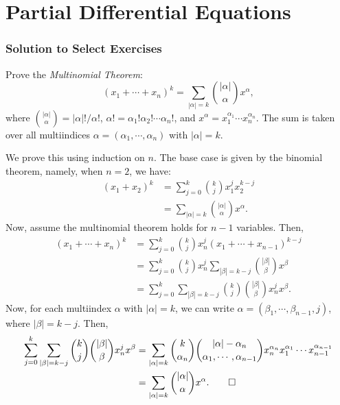 \section{Partial Differential Equations}

\subsubsection{Solution to Select Exercises}

\begin{problem}
  Prove the \emph{Multinomial Theorem}:
  \begin{equation}\label{eq:multinomial_formula}
    (x_1 + \cdots + x_n)^k = \sum_{|\alpha|=k} \binom{|\alpha|}{\alpha} x^\alpha
  ,\end{equation}
  where $\binom{|\alpha|}{\alpha} = |\alpha|!/\alpha!$, $\alpha! = \alpha_1!\alpha_2!\cdots\alpha_n!$, and $x^\alpha = x_1^{\alpha_1} \cdots x_n^{\alpha_n}$. The sum is taken over all multiindices $\alpha = (\alpha_1, \cdots, \alpha_n)$ with $|\alpha| = k$.
\end{problem}

\begin{solution}
  We prove this using induction on $n$. The base case is given by the binomial theorem, namely, when $n = 2$, we have:
  \begin{align*}
    (x_1 + x_2)^k &= \sum_{j=0}^k \binom{k}{j} x_1^j x_2^{k-j} \\
                    &= \sum_{|\alpha|=k} \binom{|\alpha|}{\alpha} x^\alpha
  .\end{align*}
  Now, assume the multinomial theorem holds for $n-1$ variables. Then,
  \begin{align*}
    (x_1 + \cdots + x_n)^k &= \sum_{j=0}^k \binom{k}{j} x_n^j (x_1 + \cdots + x_{n-1})^{k-j} \\
                            &= \sum_{j=0}^k \binom{k}{j} x_n^j \sum_{|\beta|=k-j} \binom{|\beta|}{\beta} x^\beta \\
                            &= \sum_{j=0}^k \sum_{|\beta|=k-j} \binom{k}{j} \binom{|\beta|}{\beta} x_n^j x^\beta
  .\end{align*}
  Now, for each multiindex $\alpha$ with $|\alpha| = k$, we can write $\alpha = (\beta_1, \cdots, \beta_{n-1}, j)$, where $|\beta| = k-j$. Then,
  \begin{align*}
    \sum_{j=0}^k \sum_{|\beta|=k-j} \binom{k}{j} \binom{|\beta|}{\beta} x_n^j x^\beta &= \sum_{|\alpha|=k} \binom{k}{\alpha_n} \binom{|\alpha| - \alpha_n}{\alpha_1, \cdots, \alpha_{n-1}} x_n^{\alpha_n} x_1^{\alpha_1} \cdots x_{n-1}^{\alpha_{n-1}} \\
                                                                                        &= \sum_{|\alpha|=k} \binom{|\alpha|}{\alpha} x^\alpha
  .\qedhere\end{align*}
\end{solution}

